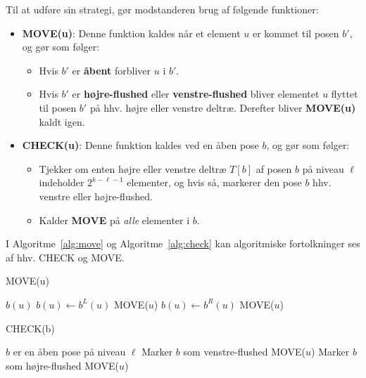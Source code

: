 Til at udføre sin strategi, gør modstanderen brug af følgende funktioner:
\begin{itemize}
	\item \textbf{MOVE(u)}: Denne funktion kaldes når et element $u$ er kommet til posen $b'$, og gør som følger:
	      \begin{itemize}
		      \item Hvis $b'$ er \textbf{åbent} forbliver $u$ i $b'$.
		      \item Hvis $b'$ er \textbf{højre-flushed} eller \textbf{venstre-flushed} bliver elementet $u$ flyttet til posen $b'$ på hhv. højre eller venstre deltræ. Derefter bliver \textbf{MOVE(u)} kaldt igen.
	      \end{itemize}
	\item \textbf{CHECK(u)}: Denne funktion kaldes ved en åben pose $b$, og gør som følger:
	      \begin{itemize}
		      \item Tjekker om enten højre eller venstre deltræ $T[b]$ af posen $b$ på niveau $\ell$ indeholder $2^{k-\ell-1}$ elementer, og hvis så, markerer den pose $b$ hhv. venstre eller højre-flushed.
		      \item Kalder \textbf{MOVE} på \textit{alle} elementer i $b$.
	      \end{itemize}
\end{itemize}

I Algoritme~\ref{alg:move} og Algoritme~\ref{alg:check} kan algoritmiske fortolkninger ses af hhv. CHECK og MOVE.

\begin{algorithm}
	\caption{\label{alg:move} MOVE(u)}
	\begin{algorithmic}[1]
		\STATE $b(u)$ 
		\RETURN
		\STATE $b(u) \gets b^L(u)$
		\STATE MOVE($u$)
		\RETURN
		\STATE $b(u) \gets b^R(u)$
		\STATE MOVE($u$)
		\RETURN
		\ENDIF
	\end{algorithmic}
\end{algorithm}

\begin{algorithm}
	\caption{\label{alg:check} CHECK(b)}
	\begin{algorithmic}[1]
		\STATE $b$ er en åben pose på niveau $\ell$
		\STATE Marker $b$ som venstre-flushed 
		\STATE MOVE($u$)
		\RETURN
		\ENDIF
		\STATE Marker $b$ som højre-flushed 
		\STATE MOVE($u$)
		\RETURN
		\ENDIF
		\RETURN
	\end{algorithmic}
\end{algorithm}

